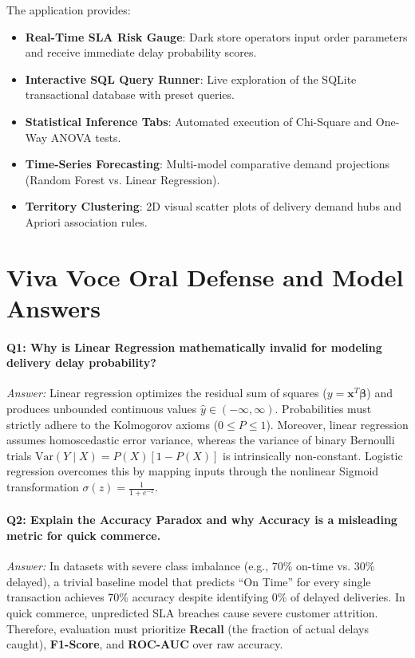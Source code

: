 \documentclass[11pt,a4paper]{article}
\begin{document}
The application provides:
\begin{itemize}[noitemsep]
    \item \textbf{Real-Time SLA Risk Gauge}: Dark store operators input order parameters and receive immediate delay probability scores.
    \item \textbf{Interactive SQL Query Runner}: Live exploration of the SQLite transactional database with preset queries.
    \item \textbf{Statistical Inference Tabs}: Automated execution of Chi-Square and One-Way ANOVA tests.
    \item \textbf{Time-Series Forecasting}: Multi-model comparative demand projections (Random Forest vs. Linear Regression).
    \item \textbf{Territory Clustering}: 2D visual scatter plots of delivery demand hubs and Apriori association rules.
\end{itemize}

\section{Viva Voce Oral Defense and Model Answers}
\label{sec:viva}

\paragraph{Q1: Why is Linear Regression mathematically invalid for modeling delivery delay probability?}
\textit{Answer:} Linear regression optimizes the residual sum of squares ($y = \mathbf{x}^T\boldsymbol{\beta}$) and produces unbounded continuous values $\hat{y} \in (-\infty, \infty)$. Probabilities must strictly adhere to the Kolmogorov axioms ($0 \leq P \leq 1$). Moreover, linear regression assumes homoscedastic error variance, whereas the variance of binary Bernoulli trials $\text{Var}(Y \mid X) = P(X)[1 - P(X)]$ is intrinsically non-constant. Logistic regression overcomes this by mapping inputs through the nonlinear Sigmoid transformation $\sigma(z) = \frac{1}{1 + e^{-z}}$.

\paragraph{Q2: Explain the Accuracy Paradox and why Accuracy is a misleading metric for quick commerce.}
\textit{Answer:} In datasets with severe class imbalance (e.g., 70\% on-time vs. 30\% delayed), a trivial baseline model that predicts ``On Time'' for every single transaction achieves 70\% accuracy despite identifying 0\% of delayed deliveries. In quick commerce, unpredicted SLA breaches cause severe customer attrition. Therefore, evaluation must prioritize \textbf{Recall} (the fraction of actual delays caught), \textbf{F1-Score}, and \textbf{ROC-AUC} over raw accuracy.
\end{document}
